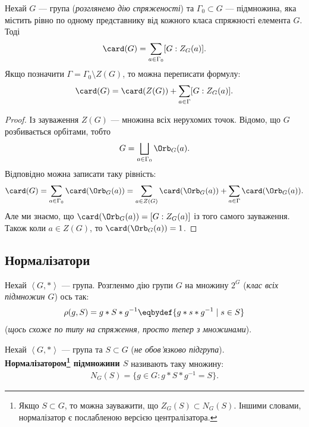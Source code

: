 \documentclass{math_library}
\begin{document}
\begin{theorem}
Нехай $G$ --- група (\textit{розглянемо дію спряженості}) та $\Gamma_0 \subset G$ --- підмножина, яка містить рівно по одному представнику від кожного класа спряжності елемента $G$. Тоді
\begin{align*}
\card(G) = \displaystyle\sum_{a \in \Gamma_0} [G: Z_G(a)].
\end{align*}
Якщо позначити $\Gamma = \Gamma_0 \setminus Z(G)$, то можна переписати формулу:
\begin{align*}
\card(G) = \card(Z(G)) + \sum_{a \in \Gamma} [G: Z_G(a)].
\end{align*}
\end{theorem}

\begin{proof}
Із зауваження $Z(G)$ --- множина всіх нерухомих точок. Відомо, що $G$ розбивається орбітами, тобто 
\[
G = \displaystyle\bigsqcup_{a \in \Gamma_0} \Orb_G(a).
\]
Відповідно можна записати таку рівність:
\[
\card(G) = \displaystyle\sum_{a \in \Gamma_0} \card(\Orb_G(a)) = \sum_{a \in Z(G)} \card(\Orb_G(a)) + \sum_{a \in \Gamma} \card(\Orb_G(a)).
\]
Але ми знаємо, що $\card(\Orb_G(a)) = [G:Z_G(a)]$ із того самого зауваження. Також коли $a \in Z(G)$, то $\card(\Orb_G(a)) = 1$.
\end{proof}

\subsection{Нормалізатори}
Нехай $\left<G,*\right>$ --- група. Розгленмо дію групи $G$ на множину $2^G$ (\textit{клас всіх підмножин $G$}) ось так:
\begin{align*}
\rho(g,S) = g*S*g^{-1} \eqbydef \{g*s*g^{-1} \mid s \in S\}
\end{align*}
(\textit{щось схоже по типу на спряження, просто тепер з множинами}).

\begin{definition}
Нехай $\left< G, *\right>$ --- група та $S \subset G$ (\textit{не обов'язково підгрупа}).\\
\textbf{Нормалізатором\footnote{Якщо $ S \subset G$, то можна зауважити, що $Z_G(S) \subset N_G(S)$. Іншими словами, нормалізатор є послабленою версією централізатора.} підмножини $S$} називають таку множину:
\begin{align*}
N_G(S) = \{g \in G: g*S*g^{-1} = S\}.
\end{align*}
\end{definition}
\end{document}
